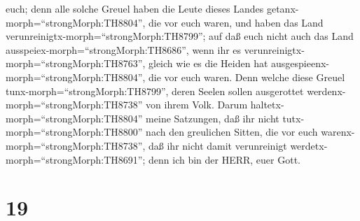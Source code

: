 euch;  denn alle solche Greuel haben die Leute dieses
Landes getanx-morph=``strongMorph:TH8804'', die vor euch waren, und
haben das Land verunreinigtx-morph=``strongMorph:TH8799''; 
auf daß euch nicht auch das Land ausspeiex-morph=``strongMorph:TH8686'',
wenn ihr es verunreinigtx-morph=``strongMorph:TH8763'', gleich wie es
die Heiden hat ausgespieenx-morph=``strongMorph:TH8804'', die vor euch
waren.  Denn welche diese Greuel
tunx-morph=``strongMorph:TH8799'', deren Seelen sollen ausgerottet
werdenx-morph=``strongMorph:TH8738'' von ihrem Volk.  Darum
haltetx-morph=``strongMorph:TH8804'' meine Satzungen, daß ihr nicht
tutx-morph=``strongMorph:TH8800'' nach den greulichen Sitten, die vor
euch warenx-morph=``strongMorph:TH8738'', daß ihr nicht damit
verunreinigt werdetx-morph=``strongMorph:TH8691''; denn ich bin der
HERR, euer Gott.

\hypertarget{section-18}{%
\section{19}\label{section-18}}

